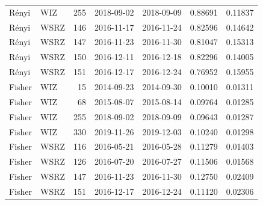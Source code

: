 \documentclass[11pt,a4paper]{article}
\begin{document}
\begin{table}[H]
\begin{tabular}{llrllrr}
		R\'enyi & WIZ & 255 & 2018-09-02 & 2018-09-09 & 0.88691 & 0.11837 \\
		\addlinespace[2pt]
		R\'enyi & WSRZ & 146 & 2016-11-17 & 2016-11-24 & 0.82596 & 0.14642 \\
		R\'enyi & WSRZ & 147 & 2016-11-23 & 2016-11-30 & 0.81047 & 0.15313 \\
		R\'enyi & WSRZ & 150 & 2016-12-11 & 2016-12-18 & 0.82296 & 0.14005 \\
		R\'enyi & WSRZ & 151 & 2016-12-17 & 2016-12-24 & 0.76952 & 0.15955 \\
		\midrule
		Fisher & WIZ & 15 & 2014-09-23 & 2014-09-30 & 0.10010 & 0.01311 \\
		Fisher & WIZ & 68 & 2015-08-07 & 2015-08-14 & 0.09764 & 0.01285 \\
		Fisher & WIZ & 255 & 2018-09-02 & 2018-09-09 & 0.09643 & 0.01287 \\
		Fisher & WIZ & 330 & 2019-11-26 & 2019-12-03 & 0.10240 & 0.01298 \\
		\addlinespace[2pt]
		Fisher & WSRZ & 116 & 2016-05-21 & 2016-05-28 & 0.11279 & 0.01403 \\
		Fisher & WSRZ & 126 & 2016-07-20 & 2016-07-27 & 0.11506 & 0.01568 \\
		Fisher & WSRZ & 147 & 2016-11-23 & 2016-11-30 & 0.12750 & 0.02409 \\
		Fisher & WSRZ & 151 & 2016-12-17 & 2016-12-24 & 0.11120 & 0.02306 \\
		\bottomrule
	\end{tabular}
\end{table}
\end{document}
